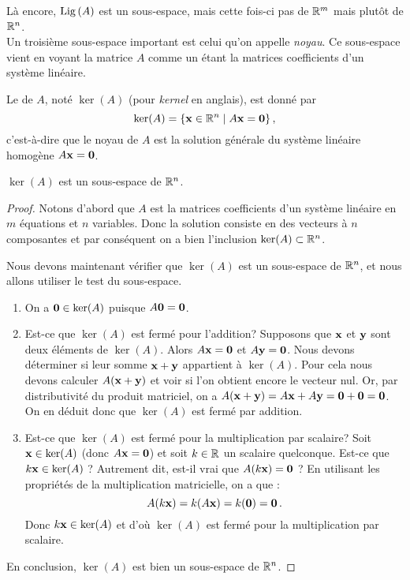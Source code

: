 Là encore, $\operatorname{Lig\,}(A)$ est un sous-espace, mais cette fois-ci pas de $\mathbb{R}^m$ mais plutôt de $\mathbb{R}^n$.\\

Un troisième sous-espace important est celui qu'on appelle \emph{noyau}. Ce sous-espace vient en voyant la matrice $A$ comme un étant la matrices coefficients d'un système linéaire. 

\begin{definition}
Le  de $A$, noté $\ker(A)$ (pour \emph{kernel} en anglais), est donn\'e par
$$
\ker(A) = \{ \mathbf{x} \in \mathbb{R}^n \mid A\mathbf{x} = \mathbf{0}\}\,,
$$
c'est-à-dire que le noyau de $A$ est la solution générale du système linéaire homogène $A\mathbf{x} = \mathbf{0}$.
\end{definition}


\begin{lemma}
$\ker(A)$ est un sous-espace de $\mathbb{R}^n$.
\end{lemma}

\begin{proof}
Notons d'abord que $A$ est la matrices coefficients d'un système linéaire en $m$ équations et $n$ variables. Donc la solution consiste en des vecteurs à $n$ composantes et par conséquent on a bien l'inclusion $\ker(A) \subset \mathbb{R}^n$.  

Nous devons maintenant vérifier que $\ker(A)$ est un sous-espace de $\mathbb{R}^n$, et nous allons utiliser
le test du sous-espace.

\begin{enumerate}
\item On a $\mathbf{0} \in \ker(A)$ puisque $A\mathbf{0} = \mathbf{0}$.
\item Est-ce que $\ker(A)$ est fermé pour l'addition?  Supposons que $\mathbf{x}$ et $\mathbf{y}$ sont deux éléments de $\ker(A)$. Alors $A\mathbf{x} = \mathbf{0}$ et 
$A\mathbf{y} = \mathbf{0}$.  Nous devons déterminer si leur somme $\mathbf{x}+\mathbf{y}$ appartient \`a $\ker(A)$. Pour cela nous devons calculer $A(\mathbf{x}+\mathbf{y})$ et voir si l'on obtient encore le vecteur nul.
Or, par distributivité du produit matriciel, on a $A(\mathbf{x}+\mathbf{y}) = A\mathbf{x}+A\mathbf{y}=\mathbf{0}+\mathbf{0}=\mathbf{0}$.  On en déduit donc
que $\ker(A)$ est fermé par addition.

\item Est-ce que $\ker(A)$ est ferm\'e pour la multiplication par scalaire?  Soit $\mathbf{x}\in \ker(A)$ (donc $A\mathbf{x} = \mathbf{0}$) et soit $k\in \mathbb{R}$ un scalaire quelconque.  Est-ce que $k\mathbf{x} \in \ker(A)$ ?  Autrement dit, est-il vrai que $A(k\mathbf{x}) = \mathbf{0}$ ?  En utilisant
les propri\'et\'es de la multiplication matricielle, on a  que :
$$
A(k\mathbf{x}) = k(A\mathbf{x}) = k(\mathbf{0}) = \mathbf{0}\,.
$$
Donc $k\mathbf{x} \in \ker(A)$ et d'o\`u $\ker(A)$ est fermé pour la multiplication par scalaire.
\end{enumerate}
En conclusion, $\ker(A)$ est bien un sous-espace de $\mathbb{R}^n$.
\end{proof}

